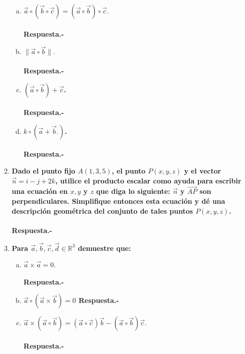 \begin{enumerate}
\begin{enumerate}[a)]
	\item \textbf{\boldmath $\vec{a}\circ \left(\vec{b}\circ \vec{c}\right)=\left(\vec{a}\circ \vec{b}\right)\circ \vec{c}.$\\\\
	    Respuesta.-}\;

	\item \textbf{\boldmath $\|\vec{a}\circ\vec{b}\|.$\\\\
	    Respuesta.-}\;

	\item \textbf{\boldmath $(\vec{a}\circ \vec{b})+\vec{c}$.\\\\
	    Respuesta.-}\; 

	\item \textbf{\boldmath $k\circ \left(\vec{a}+\vec{b}.\right)$.\\\\
	    Respuesta.-}\; 

    \end{enumerate}

\item \textbf{ \boldmath Dado el punto fijo $A(1, 3, 5)$, el punto $P(x, y, z)$ y el vector $\vec{n} = i - j + 2k$, utilice el producto escalar como ayuda para escribir una ecuación en $x, y$ y $z$ que diga lo siguiente: $\vec{n}$ y $\vec{AP}$ son perpendiculares. Simplifique entonces esta ecuación y dé una descripción geométrica del conjunto de tales puntos $P(x, y, z)$.\\\\
    Respuesta.-}\;

\item \textbf{Para \boldmath $\vec{a},\vec{b},\vec{c},\vec{d}\in \mathbb{R}^3$ demuestre que:}

	\begin{enumerate}[a)]

	    \item \textbf{\boldmath $\vec{a}\times \vec{a}=0.$\\\\
		Respuesta.-}\;

	    \item \textbf{\boldmath $\vec{a}\circ \left(\vec{a}\times \vec{b}\right)=0$
		Respuesta.-}\;

	    \item \textbf{\boldmath $\vec{a}\times \left(\vec{a}\circ \vec{b}\right)=\left(\vec{a}\circ \vec{c}\right)\vec{b}-\left(\vec{a}\circ \vec{b}\right)\vec{c}.$\\\\
		Respuesta.-}\;
	\end{enumerate}


\end{enumerate}
